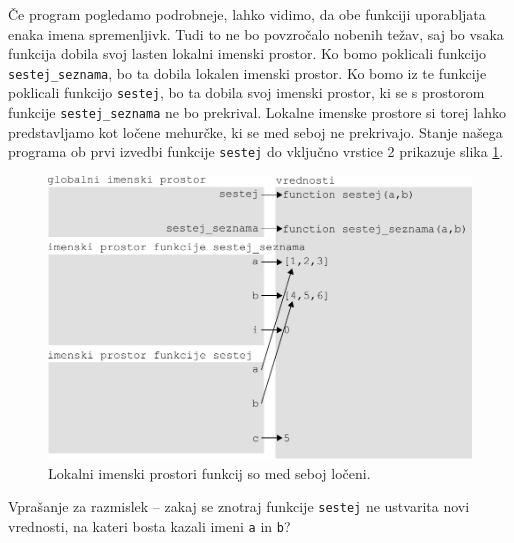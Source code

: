 Če program pogledamo podrobneje, lahko vidimo, da obe funkciji uporabljata enaka imena spremenljivk. Tudi to ne bo povzročalo nobenih težav, saj bo vsaka funkcija dobila svoj lasten lokalni imenski prostor. Ko bomo poklicali funkcijo \texttt{sestej\_seznama}, bo ta dobila lokalen imenski prostor. Ko bomo iz te funkcije poklicali funkcijo \texttt{sestej}, bo ta dobila svoj imenski prostor, ki se s prostorom funkcije \texttt{sestej\_seznama} ne bo prekrival. Lokalne imenske prostore si torej lahko predstavljamo kot ločene mehurčke, ki se med seboj ne prekrivajo. Stanje našega programa ob prvi izvedbi funkcije \texttt{sestej} do vključno vrstice 2 prikazuje slika \ref{img:imenski_prostor_8}.
\begin{figure}
    \centering
    \includegraphics[width=\linewidth]{img/imenski_prostor_8.pdf}
    \caption{Lokalni imenski prostori funkcij so med seboj ločeni.}
    \label{img:imenski_prostor_8}
\end{figure}
Vprašanje za razmislek -- zakaj se znotraj funkcije \texttt{sestej} ne ustvarita novi vrednosti, na kateri bosta kazali imeni \texttt{a} in \texttt{b}?


